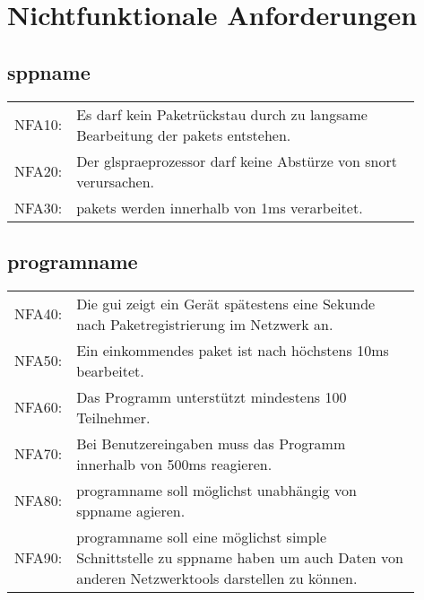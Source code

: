 \chapter{Nichtfunktionale Anforderungen}

\section{\gls{sppname}}
\begin{tabular}{lp{0.9\linewidth}}
NFA10: & Es darf kein Paketrückstau durch zu langsame Bearbeitung der \glspl{paket} entstehen. \\

NFA20: & Der gls{praeprozessor} darf keine Abstürze von \gls{snort} verursachen. \\

NFA30: & \glspl{paket} werden innerhalb von 1ms verarbeitet.
\end{tabular}
\section{\gls{programname}}
\begin{tabular}{lp{0.9\linewidth}}
NFA40: & Die \gls{gui} zeigt ein Gerät spätestens eine Sekunde nach Paketregistrierung im Netzwerk an. \\

NFA50: & Ein einkommendes \gls{paket} ist nach höchstens 10ms bearbeitet. \\

NFA60: & Das Programm unterstützt mindestens 100 Teilnehmer. \\

NFA70: & Bei Benutzereingaben muss das Programm innerhalb von 500ms reagieren. \\

NFA80: & \gls{programname} soll möglichst unabhängig von \gls{sppname} agieren. \\

NFA90: & \gls{programname} soll eine möglichst simple Schnittstelle zu \gls{sppname} haben um auch Daten von anderen Netzwerktools darstellen zu können. \\
\end{tabular}
